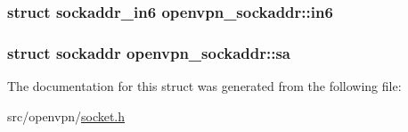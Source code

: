 \subsubsection[{in6}]{\setlength{\rightskip}{0pt plus 5cm}struct sockaddr\+\_\+in6 openvpn\+\_\+sockaddr\+::in6}\label{structopenvpn__sockaddr_afcdd41c2aad5907c7041ffdb59ed46aa}
\hypertarget{structopenvpn__sockaddr_abc5254db5ef7e60854146a476054abe1}{}
\subsubsection[{sa}]{\setlength{\rightskip}{0pt plus 5cm}struct sockaddr openvpn\+\_\+sockaddr\+::sa}\label{structopenvpn__sockaddr_abc5254db5ef7e60854146a476054abe1}


The documentation for this struct was generated from the following file\+:\begin{DoxyCompactItemize}
\item 
src/openvpn/\hyperlink{socket_8h}{socket.\+h}\end{DoxyCompactItemize}
